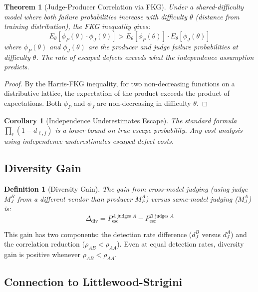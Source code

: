 \documentclass[11pt, a4paper, copyright]{googledeepmind}
\newtheorem{definition}{Definition}[section]
\newtheorem{theorem}{Theorem}[section]
\newtheorem{corollary}{Corollary}[section]
\newcommand{\Pesc}{P_{\mathrm{esc}}}
\begin{document}
\begin{theorem}[Judge-Producer Correlation via FKG]
\label{thm:fkg}
Under a shared-difficulty model where both failure probabilities increase with difficulty $\theta$ (distance from training distribution), the FKG inequality \citep{fkg1971} gives:
\begin{equation}
E_\theta[\phi_P(\theta) \cdot \phi_J(\theta)] > E_\theta[\phi_P(\theta)] \cdot E_\theta[\phi_J(\theta)]
\end{equation}
where $\phi_P(\theta)$ and $\phi_J(\theta)$ are the producer and judge failure probabilities at difficulty $\theta$. The rate of escaped defects exceeds what the independence assumption predicts.
\end{theorem}

\begin{proof}
By the Harris-FKG inequality, for two non-decreasing functions on a distributive lattice, the expectation of the product exceeds the product of expectations. Both $\phi_P$ and $\phi_J$ are non-decreasing in difficulty $\theta$.
\end{proof}

\begin{corollary}[Independence Underestimates Escape]
\label{cor:underestimate}
The standard formula $\prod_\ell (1 - d_{\ell,j})$ is a lower bound on true escape probability. Any cost analysis using independence underestimates escaped defect costs.
\end{corollary}

\subsection{Diversity Gain}

\begin{definition}[Diversity Gain]
The gain from cross-model judging (using judge $M_J^B$ from a different vendor than producer $M_P^A$) versus same-model judging ($M_J^A$) is:
\begin{equation}
\Delta_{\mathrm{div}} = \Pesc^{A \text{ judges } A} - \Pesc^{B \text{ judges } A}
\end{equation}
\end{definition}

This gain has two components: the detection rate difference ($d_J^B$ versus $d_J^A$) and the correlation reduction ($\rho_{AB} < \rho_{AA}$). Even at equal detection rates, diversity gain is positive whenever $\rho_{AB} < \rho_{AA}$.

\subsection{Connection to Littlewood-Strigini}
\end{document}
